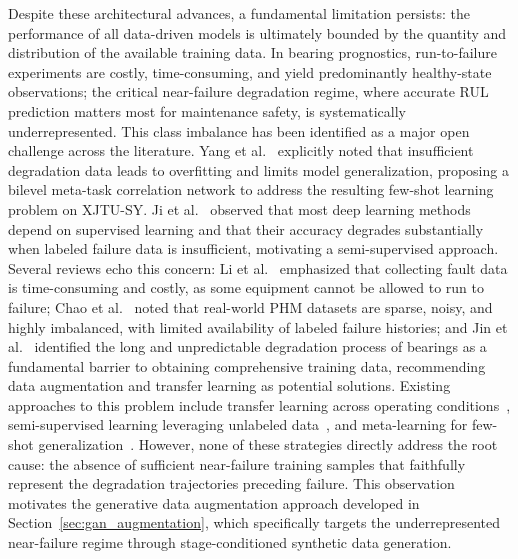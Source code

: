 Despite these architectural advances, a fundamental limitation
persists: the performance of all data-driven models is ultimately
bounded by the quantity and distribution of the available training
data. In bearing prognostics, run-to-failure experiments are costly,
time-consuming, and yield predominantly healthy-state observations;
the critical near-failure degradation regime, where accurate RUL
prediction matters most for maintenance safety, is systematically
underrepresented. This class imbalance has been identified as a
major open challenge across the literature.
Yang et al.~\cite{YANG2026114614} explicitly noted that insufficient
degradation data leads to overfitting and limits model generalization,
proposing a bilevel meta-task correlation network to address the
resulting few-shot learning problem on XJTU-SY.
Ji et al.~\cite{ji_semi-supervised_2026} observed that most deep
learning methods depend on supervised learning and that their accuracy
degrades substantially when labeled failure data is insufficient,
motivating a semi-supervised approach. Several reviews echo this
concern: Li et al.~\cite{s25144481} emphasized that collecting fault
data is time-consuming and costly, as some equipment cannot be allowed
to run to failure; Chao et al.~\cite{machines14040412} noted that
real-world PHM datasets are sparse, noisy, and highly imbalanced, with
limited availability of labeled failure histories; and
Jin et al.~\cite{jin_graph_2025} identified the long and
unpredictable degradation process of bearings as a fundamental barrier
to obtaining comprehensive training data, recommending data
augmentation and transfer learning as potential solutions.
Existing approaches to this problem include transfer learning across
operating conditions~\cite{DENG2026112193, YONGXING2026104313},
semi-supervised learning leveraging unlabeled
data~\cite{ji_semi-supervised_2026}, and meta-learning for few-shot
generalization~\cite{YANG2026114614}. However, none of these
strategies directly address the root cause: the absence of
sufficient near-failure training samples that faithfully represent
the degradation trajectories preceding failure. This observation
motivates the generative data augmentation approach developed in
Section~\ref{sec:gan_augmentation}, which specifically targets the
underrepresented near-failure regime through stage-conditioned
synthetic data generation.\\


